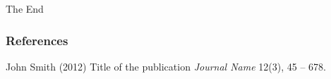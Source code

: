 \documentclass{beamer}
\begin{document}
%




\begin{frame}
\Huge{\centerline{The End}}
\end{frame}

\begin{frame}
\frametitle{References}
\footnotesize{
\begin{thebibliography}{99} %
 John Smith (2012)
\newblock Title of the publication
\newblock \emph{Journal Name} 12(3), 45 -- 678.
\end{thebibliography}
}
\end{frame}




\end{document}
